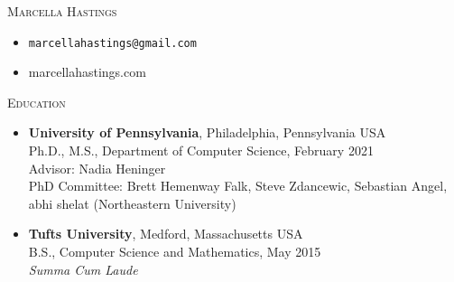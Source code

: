 \documentclass{article}
\begin{document}
\textsc{Marcella Hastings}
\begin{itemize}[label={},noitemsep, topsep=0pt]
  \item \texttt{marcellahastings@gmail.com}
  \item marcellahastings.com\\
\end{itemize}

\textsc{Education}
\begin{itemize}[label={}, topsep=0pt]
  \item \textbf{University of Pennsylvania}, Philadelphia, Pennsylvania USA \\
    Ph.D., M.S., Department of Computer Science, February 2021 \\
    Advisor: Nadia Heninger\\
    PhD Committee: Brett Hemenway Falk, Steve Zdancewic, Sebastian Angel, abhi shelat (Northeastern University)
    
  \item \textbf{Tufts University}, Medford, Massachusetts USA \\
    B.S., Computer Science and Mathematics, May 2015 \\
    \textit{Summa Cum Laude} \\
\end{itemize}
\end{document}
